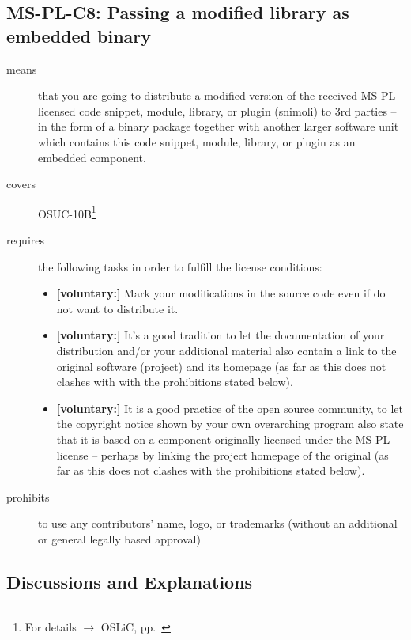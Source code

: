 \subsection{MS-PL-C8: Passing a modified library as embedded binary}
\label{OSUC-10B-MS-PL}
\begin{description}
\item[means] that you are going to distribute a modified version of the received
MS-PL licensed code snippet, module, library, or plugin (snimoli) to 3rd parties
-- in the form of a binary package together with another larger software unit
which contains this code snippet, module, library, or plugin as an embedded
component.

\item[covers] OSUC-10B\footnote{For details $\rightarrow$ OSLiC, pp.\
\pageref{OSUC-10B-DEF}}
\item[requires] the following tasks in order to fulfill the license conditions:
\begin{itemize}
 
  \item \textbf{[voluntary:]} Mark your modifications in the source code even if
  do not want to distribute it.
  
  \item \textbf{[voluntary:]} It's a good tradition to let the documentation of
  your distribution and/or your additional material also contain a link to the
  original software (project) and its homepage (as far as this does not clashes
  with with the prohibitions stated below).
  
  \item \textbf{[voluntary:]} It is a good practice of the open source
  community, to let the copyright notice shown by your own overarching program
  also state that it is based on a component originally licensed under the MS-PL
  license -- perhaps by linking the project homepage of the original (as far as
  this does not clashes with the prohibitions stated below).
  
\end{itemize}

\item[prohibits] to use any contributors' name, logo, or trademarks (without an
additional or general legally based approval)

\end{description}

\subsection{Discussions and Explanations}

